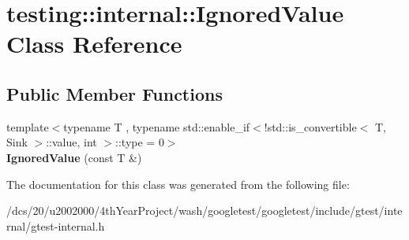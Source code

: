\hypertarget{classtesting_1_1internal_1_1IgnoredValue}{}\section{testing\+:\+:internal\+:\+:Ignored\+Value Class Reference}
\label{classtesting_1_1internal_1_1IgnoredValue}
\subsection*{Public Member Functions}
\begin{DoxyCompactItemize}
\item 
\mbox{\label{classtesting_1_1internal_1_1IgnoredValue_a851d14f6c0f584d5c5a49ddbc06d6538}} 
{\footnotesize template$<$typename T , typename std\+::enable\+\_\+if$<$!std\+::is\+\_\+convertible$<$ T, Sink $>$\+::value, int $>$\+::type  = 0$>$ }\\{\bfseries Ignored\+Value} (const T \&)
\end{DoxyCompactItemize}


The documentation for this class was generated from the following file\+:\begin{DoxyCompactItemize}
\item 
/dcs/20/u2002000/4th\+Year\+Project/wash/googletest/googletest/include/gtest/internal/gtest-\/internal.\+h\end{DoxyCompactItemize}
